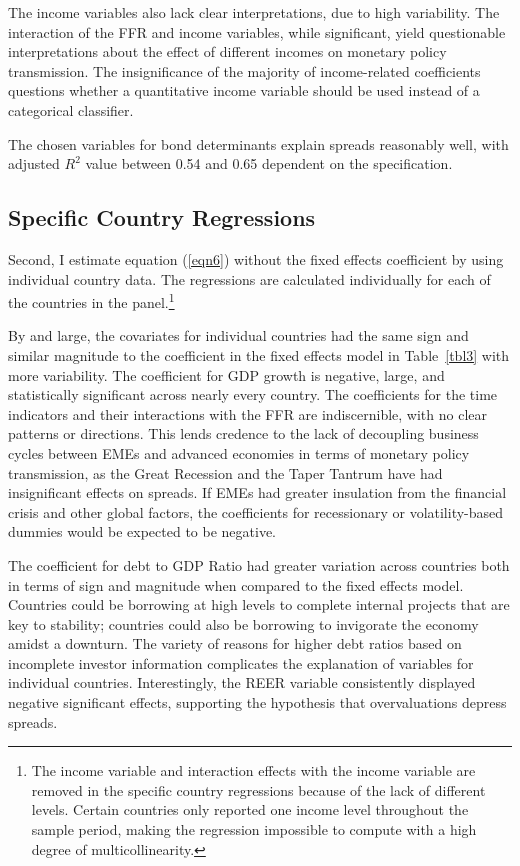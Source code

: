 \documentclass[12pt]{article}
\begin{document}
The income variables also lack clear interpretations, due to high variability. The interaction of the FFR and income variables, while significant, yield questionable interpretations about the effect of different incomes on monetary policy transmission. The insignificance of the majority of income-related coefficients questions whether a quantitative income variable should be used instead of a categorical classifier.

The chosen variables for bond determinants explain spreads reasonably well, with adjusted $R^{2}$ value between 0.54 and 0.65 dependent on the specification.
%
%
%
%
\subsection{Specific Country Regressions}
Second, I estimate equation (\ref{eqn6}) without the fixed effects coefficient by using individual country data. The regressions are  calculated individually for each of the countries in the panel.\footnote{The income variable and interaction effects with the income variable are removed in the specific country regressions because of the lack of different levels. Certain countries only reported one income level throughout the sample period, making the regression impossible to compute with a high degree of multicollinearity.}

By and large, the covariates for individual countries had the same sign and similar magnitude to the coefficient in the fixed effects model in Table~\ref{tbl3} with more variability. The coefficient for GDP growth is negative, large, and statistically significant across nearly every country. The coefficients for the time indicators and their interactions with the FFR are indiscernible, with no clear patterns or directions. This lends credence to the lack of decoupling business cycles between EMEs and advanced economies in terms of monetary policy transmission, as the Great Recession and the Taper Tantrum have had insignificant effects on spreads. If EMEs had greater insulation from the financial crisis and other global factors, the coefficients for recessionary or volatility-based dummies would be expected to be negative.

The coefficient for debt to GDP Ratio had greater variation across countries both in terms of sign and magnitude when compared to the fixed effects model. Countries could be borrowing at high levels to complete internal projects that are key to stability; countries could also be borrowing to invigorate the economy amidst a downturn. The variety of reasons for higher debt ratios based on incomplete investor information complicates the explanation of variables for individual countries. Interestingly, the REER variable consistently displayed negative significant effects, supporting the hypothesis that overvaluations depress spreads.
\end{document}

